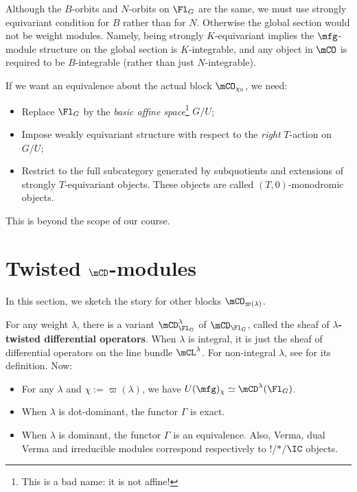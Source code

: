 	\begin{warn}
		Although the $B$-orbits and $N$-orbits on $\Fl_G$ are the same, we must use strongly equivariant condition for $B$ rather than for $N$. Otherwise the global section would not be weight modules. Namely, being strongly $K$-equivariant implies the $\mfg$-module structure on the global section is $K$-integrable, and any object in $\mCO$ is required to be $B$-integrable (rather than just $N$-integrable).
	\end{warn}
	
	\begin{rem}
		If we want an equivalence about the actual block $\mCO_{\chi_0}$, we need:
		\begin{itemize}
			\item 
				Replace $\Fl_G$ by the \emph{basic affine space}\footnote{This is a bad name: it is not affine!} $G/U$;
			\item
				Impose weakly equivariant structure with respect to the \emph{right} $T$-action on $G/U$;
			\item
				Restrict to the full subcategory generated by subquotients and extensions of strongly $T$-equivariant objects. These objects are called $(T,0)$-monodromic objects.
		\end{itemize}
		This is beyond the scope of our course.

	\end{rem}


\section{Twisted \texorpdfstring{$\mCD$}{D}-modules}

	In this section, we sketch the story for other blocks $\mCO_{\varpi(\lambda)}$.

	For any weight $\lambda$, there is a variant $\mCD_{\Fl_G}^\lambda$ of $\mCD_{\Fl_G}$, called the sheaf of \textbf{$\lambda$-twisted differential operators}. When $\lambda$ is integral, it is just the sheaf of differential operators on the line bundle $\mCL^\lambda$. For non-integral $\lambda$, see \cite[Section 9]{G} for its definition. Now:
	\begin{itemize}
		\item 
			For any $\lambda$ and $\chi:=\varpi(\lambda)$, we have $U(\mfg)_{\chi} \simeq \mCD^\lambda(\Fl_G)$.
		\item 
			When $\lambda$ is dot-dominant, the functor $\Gamma$ is exact.
		\item
			When $\lambda$ is dominant, the functor $\Gamma$ is an equivalence. Also, Verma, dual Verma and irreducible modules correspond respectively to $!$/$*$/$\IC$ objects.
	\end{itemize} 
	

